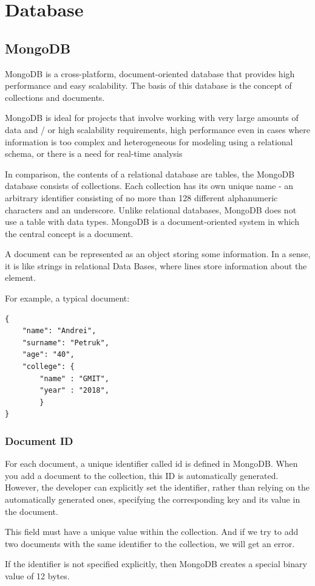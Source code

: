 \section{Database}

\subsection{MongoDB}
MongoDB is a cross-platform, document-oriented database that provides high performance and easy scalability. The basis of this database is the concept of collections and documents.\par
MongoDB is ideal for projects that involve working with very large amounts of data and / or high scalability requirements, high performance even in cases where information is too complex and heterogeneous for modeling using a relational schema, or there is a need for real-time analysis \par
In comparison, the contents of a relational database are tables, the MongoDB database consists of collections. Each collection has its own unique name - an arbitrary identifier consisting of no more than 128 different alphanumeric characters and an underscore.
Unlike relational databases, MongoDB does not use a table with data types. MongoDB is a document-oriented system in which the central concept is a document. \par
A document can be represented as an object storing some information. In a sense, it is like strings in relational Data Bases, where lines store information about the element. \cite{MongoDB} \par For example, a typical document:

\begin{verbatim}
{
    "name": "Andrei",
    "surname": "Petruk",
    "age": "40",
    "college": {
        "name" : "GMIT",
        "year" : "2018",
        }
}
\end{verbatim}

\subsubsection{Document ID}
For each document, a unique identifier called id is defined in MongoDB. When you add a document to the collection, this ID is automatically generated. However, the developer can explicitly set the identifier, rather than relying on the automatically generated ones, specifying the corresponding key and its value in the document.\par
This field must have a unique value within the collection. And if we try to add two documents with the same identifier to the collection, we will get an error.\par
If the identifier is not specified explicitly, then MongoDB creates a special binary value of 12 bytes.\cite{MongoDBID}

